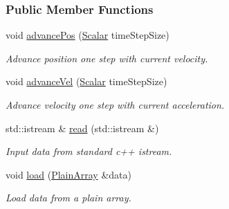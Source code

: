 \subsubsection*{Public Member Functions}
\begin{DoxyCompactItemize}
\item 
void \mbox{\hyperlink{classregu_system_3_01_newtonian_3_01typename_01_evolved_data_1_1_scalar_01_4_00_01_evolved_data_00_01_regularitor_01_4_ae0b6977439ce7171e5ef5767237e050d}{advance\+Pos}} (\mbox{\hyperlink{classregu_system_3_01_newtonian_3_01typename_01_evolved_data_1_1_scalar_01_4_00_01_evolved_data_00_01_regularitor_01_4_a6993f135075541f441a7642845b183a5}{Scalar}} time\+Step\+Size)
\begin{DoxyCompactList}\small\item\em Advance position one step with current velocity. \end{DoxyCompactList}\item 
void \mbox{\hyperlink{classregu_system_3_01_newtonian_3_01typename_01_evolved_data_1_1_scalar_01_4_00_01_evolved_data_00_01_regularitor_01_4_a04de03e59e9369cae79251b8ab876c2c}{advance\+Vel}} (\mbox{\hyperlink{classregu_system_3_01_newtonian_3_01typename_01_evolved_data_1_1_scalar_01_4_00_01_evolved_data_00_01_regularitor_01_4_a6993f135075541f441a7642845b183a5}{Scalar}} time\+Step\+Size)
\begin{DoxyCompactList}\small\item\em Advance velocity one step with current acceleration. \end{DoxyCompactList}\item 
std\+::istream \& \mbox{\hyperlink{classregu_system_3_01_newtonian_3_01typename_01_evolved_data_1_1_scalar_01_4_00_01_evolved_data_00_01_regularitor_01_4_a0cfd66a24e4b23158a6450510c40ab31}{read}} (std\+::istream \&)
\begin{DoxyCompactList}\small\item\em Input data from standard c++ istream. \end{DoxyCompactList}\item 
void \mbox{\hyperlink{classregu_system_3_01_newtonian_3_01typename_01_evolved_data_1_1_scalar_01_4_00_01_evolved_data_00_01_regularitor_01_4_a968643b9deaa2a579a025652238fdc75}{load}} (\mbox{\hyperlink{classregu_system_3_01_newtonian_3_01typename_01_evolved_data_1_1_scalar_01_4_00_01_evolved_data_00_01_regularitor_01_4_a26da8a1ed92e5aced3615da524ef37b3}{Plain\+Array}} \&data)
\begin{DoxyCompactList}\small\item\em Load data from a plain array. \end{DoxyCompactList}\item 

\end{DoxyCompactItemize}
